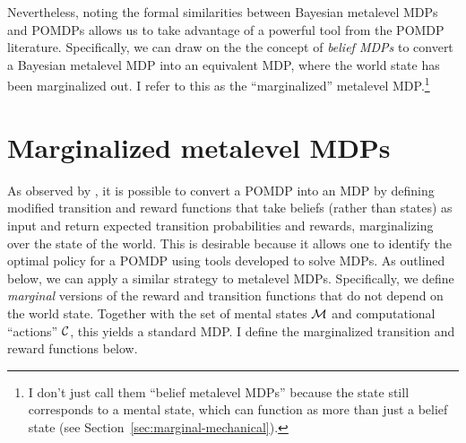 
Nevertheless, noting the formal similarities between Bayesian metalevel MDPs and POMDPs allows us to take advantage of a powerful tool from the POMDP literature. Specifically, we can draw on the the concept of \emph{belief MDPs} \citep{kaelbling1998planningb} to convert a Bayesian metalevel MDP into an equivalent MDP, where the world state has been marginalized out. I refer to this as the ``marginalized'' metalevel MDP.\footnote{I don't just call them ``belief metalevel MDPs'' because the state still corresponds to a mental state, which can function as more than just a belief state (see Section~\ref{sec:marginal-mechanical}).}

\section{Marginalized metalevel MDPs}\label{sec:metamdp-marginalized}

As observed by \citet{kaelbling1998planningb}, it is possible to convert a POMDP into an MDP by defining modified transition and reward functions that take beliefs (rather than states) as input and return expected transition probabilities and rewards, marginalizing over the state of the world. This is desirable because it allows one to identify the optimal policy for a POMDP using tools developed to solve MDPs. As outlined below, we can apply a similar strategy to metalevel MDPs. Specifically, we define \emph{marginal} versions of the reward and transition functions that do not depend on the world state. Together with the set of mental states $\mathcal{M}$ and computational ``actions'' $\mathcal{C}$, this yields a standard MDP. I define the marginalized transition and reward functions below.



